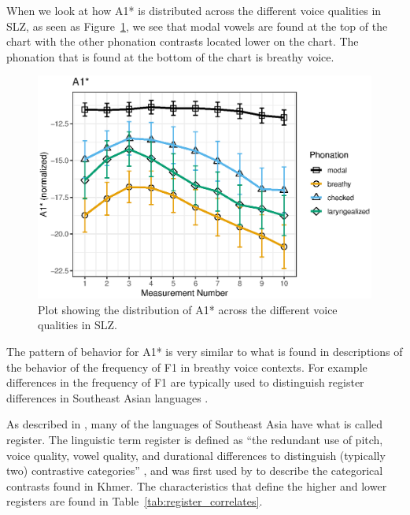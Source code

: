 When we look at how A1* is distributed across the different voice qualities in SLZ, as seen as Figure~\ref{fig:a1}, we see that modal vowels are found at the top of the chart with the other phonation contrasts located lower on the chart. The phonation that is found at the bottom of the chart is breathy voice. 
\begin{figure}[h!]
    \centering
    \includegraphics[width = 0.9\linewidth]{images/slz_a1c.eps}
    \caption{Plot showing the distribution of A1* across the different voice qualities in SLZ.}
    \label{fig:a1}
\end{figure}

The pattern of behavior for A1* is very similar to what is found in descriptions of the behavior of the frequency of F1 in breathy voice contexts. For example differences in the frequency of F1 are typically used to distinguish register differences in Southeast Asian languages \citep{brunelleRegisterEasternCham2005,brunelleDialectExperiencePerceptual2012,brunelleTonePhonationSoutheast2016}.

As described in \citet{brunelleTonePhonationSoutheast2016}, many of the languages of Southeast Asia have what is called register. The linguistic term register is defined as ``the redundant use of pitch, voice quality, vowel quality, and durational differences to distinguish (typically two) contrastive categories'' \citep[193]{brunelleTonePhonationSoutheast2016}, and was first used by \citet{hendersonMainFeaturesCambodian1952} to describe the categorical contrasts found in Khmer. The characteristics that define the higher and lower registers are found in Table~\ref{tab:register_correlates}.

